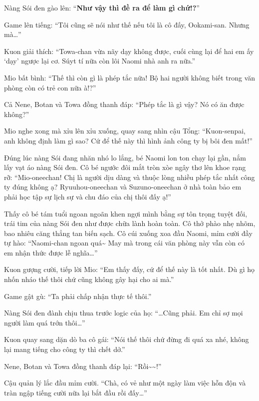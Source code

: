 \documentclass[../main.tex]{subfiles}
\begin{document}
Nàng Sói đen gào lên: ``\textbf{Như vậy thì đề ra để làm gì chứ!?}''

Game lên tiếng: ``Tôi cũng sẽ nói như thế nếu tôi là cô đấy, Ookami-san. Nhưng mà\dots''

Kuon giải thích: ``Towa-chan vừa nãy dạy không được, cuối cùng lại để hai em ấy `dạy' ngược lại cơ. Súyt tí nữa còn lôi Naomi nhà anh ra nữa.''

Mio bất bình: ``Thế thì còn gì là phép tắc nữa! Bộ hai người không biết trong văn phòng còn có trẻ con nữa à!?''

Cả Nene, Botan và Towa đồng thanh đáp: ``Phép tắc là gì vậy? Nó có ăn được không?''

Mio nghe xong mà xỉu lên xỉu xuống, quay sang nhìn cậu Tổng: ``Kuon-senpai, anh không định làm gì sao? Cứ để thế này thì hình ảnh công ty bị bôi đen mất!''

Đúng lúc nàng Sói đang nhăn nhó lo lắng, bé Naomi lon ton chạy lại gần, nắm lấy vạt áo nàng Sói đen. Cô bé ngước đôi mắt tròn xòe ngây thơ lên khoe rạng rỡ: ``Mio-oneechan! Chị là người dịu dàng và thuộc lòng nhiều phép tắc nhất công ty đúng không ạ? Ryuuhou-oneechan và Suzuno-oneechan ở nhà toàn bảo em phải học tập sự lịch sự và chu đáo của chị thôi đấy ạ!''

Thấy cô bé tám tuổi ngoan ngoãn khen ngợi mình bằng sự tôn trọng tuyệt đối, trái tim của nàng Sói đen như được chữa lành hoàn toàn. Cô thở phào nhẹ nhõm, bao nhiêu căng thẳng tan biến sạch. Cô cúi xuống xoa đầu Naomi, mỉm cười đầy tự hào: ``Naomi-chan ngoan quá\~{} May mà trong cái văn phòng này vẫn còn có em nhận thức được lễ nghĩa\dots''

Kuon gượng cười, tiếp lời Mio: ``Em thấy đấy, cứ để thế này là tốt nhất. Dù gì họ nhốn nháo thế thôi chứ cũng không gây hại cho ai mà.''

Game gật gù: ``Ta phải chấp nhận thực tế thôi.''

Nàng Sói đen đành chịu thua trước logic của họ: ``\dots Cũng phải. Em chỉ sợ mọi người làm quá trớn thôi\dots''

Kuon quay sang dặn dò ba cô gái: ``Nói thế thôi chứ đừng đi quá xa nhé, không lại mang tiếng cho công ty thì chết dở.''

Nene, Botan và Towa đồng thanh đáp lại: ``Rồi\~{}\~{}!''

Cậu quản lý lắc đầu mỉm cười. ``Chà, có vẻ như một ngày làm việc hỗn độn và tràn ngập tiếng cười nữa lại bắt đầu rồi đấy\dots''
\end{document}
